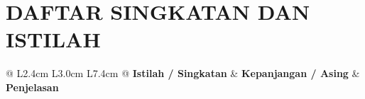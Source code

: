 
\chapter*{DAFTAR SINGKATAN DAN ISTILAH}

\vspace{0.5cm}

\setlength{\tabcolsep}{4pt}
\begin{longtable}{@{} L{2.4cm} L{3.0cm} L{7.4cm} @{}}
\textbf{Istilah / Singkatan} & \textbf{Kepanjangan / Asing} & \textbf{Penjelasan} \\[2ex]
\endhead %


\end{longtable}
